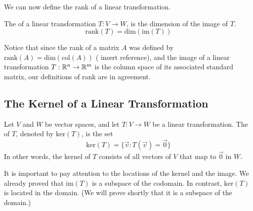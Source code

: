 \documentclass{ximera}
\begin{document}
We can now define the rank of a linear transformation.

\begin{definition}\label{def:rankofT}
The  of a linear transformation $T:V\rightarrow W$, is the dimension of the image of $T$.
$$\mbox{rank}(T)=\mbox{dim}(\mbox{im}(T))$$
\end{definition}

Notice that since the rank of a matrix $A$ was defined by $\mbox{rank}(A) = \mbox{dim}(\mbox{col}(A))$ ({\color{red} insert reference}), and the image of a linear transformation $T:\mathbb{R}^n\rightarrow \mathbb{R}^m$ is the column space of its associated standard matrix, our definitions of rank are in agreement.

\subsection*{The Kernel of a Linear Transformation}

\begin{definition}
Let $V$ and $W$ be vector spaces, and let $T:V\rightarrow W$ be a linear transformation.  The  of $T$, denoted by $\mbox{ker}(T)$, is the set
$$\mbox{ker}(T)=\{\vec{v}:T(\vec{v})=\vec{0}\}$$
In other words, the kernel of $T$ consists of all vectors of $V$ that map to $\vec{0}$ in $W$.
\end{definition}
It is important to pay attention to the locations of the kernel and the image.  We already proved that $\mbox{im}(T)$ is a subspace of the codomain.  In contrast, $\mbox{ker}(T)$ is located in the domain.  (We will prove shortly that it is a subspace of the domain.)

\begin{image}
\end{image}
\end{document}
